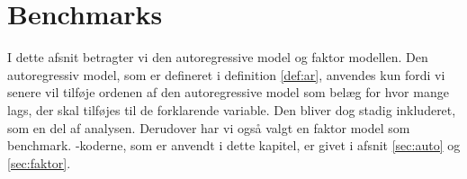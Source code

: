 \chapter{Benchmarks}
I dette afsnit betragter vi den autoregressive model og faktor modellen. 
Den autoregressiv model, som er defineret i definition \ref{def:ar}, anvendes kun fordi vi senere vil tilføje ordenen af den autoregressive model som belæg for hvor mange lags, der skal tilføjes til de forklarende variable. 
Den bliver dog stadig inkluderet, som en del af analysen.
Derudover har vi også valgt en faktor model som benchmark.
\Rlang-koderne, som er anvendt i dette kapitel, er givet i afsnit \ref{sec:auto} og \ref{sec:faktor}.






